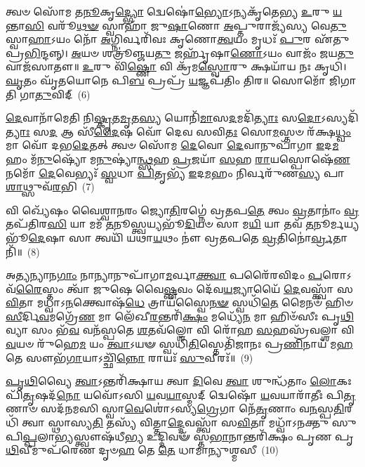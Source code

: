 {\anuvakamend[{𑌅𑌨𑍀᳴𑌕𑍇\-\ul{𑌨𑌾}\-𑌷𑍍𑌟𑍗 𑌚᳴}]}%

𑌤𑍍𑌵𑍞 𑌸𑍋᳴𑌮 𑌤\-\ul{𑌨𑍂}\-𑌕𑍃\-\ul{𑌦𑍍𑌭𑍍𑌯𑍋} 𑌦𑍍𑌵𑍇𑌷𑍋॑\-\ul{𑌭𑍍𑌯𑍋}\-\-𑌽𑌨𑍍𑌯𑌕𑍃᳴𑌤𑍇𑌭𑍍𑌯 \ul{𑌉}\-𑌰𑍁 \ul{𑌯}\-𑌨𑍍𑌤𑌾\-\ul{𑌸𑌿} 𑌵𑌰𑍂᳴\-\ul{𑌥}\-\-\ul{𑍟} 𑌸𑍍𑌵𑌾𑌹𑌾᳴ 𑌜𑍁\-\ul{𑌷𑌾}\-𑌣𑍋 \ul{𑌅}\-𑌪𑍍𑌤𑍁𑌰𑌾𑌜𑍍𑌯᳴𑌸𑍍𑌯 𑌵𑍇\-\ul{𑌤𑍁} 𑌸𑍍𑌵𑌾\-\ul{𑌹𑌾}\-\-𑌽𑌯𑌂 𑌨𑍋᳴ \ul{𑌅}\-𑌗𑍍𑌨𑌿𑌰𑍍𑌵𑌰𑌿᳴𑌵𑌃 𑌕𑍃𑌣𑍋\-\ul{𑌤𑍍𑌵}\-𑌯𑌂 𑌮𑍃𑌧𑌃᳴ \ul{𑌪𑍁}\-𑌰 𑌏᳴𑌤𑍁 𑌪𑍍𑌰\-\ul{𑌭𑌿}\-𑌨𑍍𑌦𑌨𑍍𑌨𑍍। \ul{𑌅}\-𑌯𑍞 𑌶𑌤𑍍𑌰𑍂॑𑌞𑍍𑌜𑌯\-\ul{𑌤𑍁} 𑌜𑌰𑍍\mbox{}𑌹𑍃᳴𑌷𑌾\-\ul{𑌣𑍋}\-\-𑌽𑌯𑌂 𑌵𑌾𑌜𑌂᳴ 𑌜𑌯\-\ul{𑌤𑍁} 𑌵𑌾𑌜᳴𑌸𑌾𑌤𑍗॥ \ul{𑌉}\-𑌰𑍁 𑌵𑌿᳴\-\ul{𑌷𑍍𑌣𑍋} 𑌵𑌿 𑌕𑍍𑌰᳴𑌮\-\ul{𑌸𑍍𑌵𑍋}\-𑌰𑍁 𑌕𑍍𑌷𑌯𑌾᳴𑌯 𑌨𑌃 𑌕𑍃𑌧𑌿। \ul{𑌘𑍃}\-𑌤𑌂 𑌘𑍃᳴𑌤𑌯𑍋𑌨𑍇 𑌪𑌿\-\ul{𑌬} 𑌪𑍍𑌰𑌪𑍍𑌰᳴ \ul{𑌯}\-𑌜𑍍𑌞𑌪᳴𑌤𑌿𑌂 𑌤𑌿𑌰॥ 𑌸𑍋𑌮𑍋᳴ 𑌜𑌿𑌗𑌾𑌤𑌿 𑌗𑌾\-\ul{𑌤𑍁}\-𑌵𑌿𑌦𑍍~(6)

\-\ul{𑌦𑍇}\-𑌵𑌾𑌨𑌾᳴𑌮𑍇𑌤𑌿 𑌨𑌿\-\ul{𑌷𑍍𑌕𑍃}\-𑌤\-\ul{𑌮𑍃}\-𑌤\-\ul{𑌸𑍍𑌯} 𑌯𑍋𑌨𑌿᳴\-\ul{𑌮𑌾}\-𑌸\-\ul{𑌦}\-𑌮𑌦𑌿᳴\-\ul{𑌤𑍍𑌯𑌾𑌃} 𑌸\-\ul{𑌦𑍋}\-\-𑌽𑌸𑍍𑌯𑌦𑌿᳴\-\ul{𑌤𑍍𑌯𑌾𑌃} 𑌸\-\ul{𑌦} 𑌆 𑌸𑍀᳴\-\ul{𑌦𑍈}\-𑌷 𑌵𑍋᳴ 𑌦𑍇𑌵 𑌸𑌵𑌿\-\ul{𑌤𑌃} 𑌸𑍋\-\ul{𑌮}\-𑌸𑍍𑌤𑍞 𑌰᳴𑌕𑍍𑌷\-\ul{𑌧𑍍𑌵𑌂} 𑌮𑌾 𑌵𑍋᳴ 𑌦𑌭\-\ul{𑌦𑍇}\-𑌤𑌤𑍍 𑌤𑍍𑌵𑍞 𑌸𑍋᳴𑌮 \ul{𑌦𑍇}\-𑌵𑍋 \ul{𑌦𑍇}\-𑌵𑌾𑌨𑍁𑌪𑌾᳴𑌗𑌾 \ul{𑌇}\-𑌦\-\ul{𑌮}\-𑌹𑌂 𑌮᳴\-\ul{𑌨𑍁}\-𑌷𑍍𑌯𑍋᳴ 𑌮\-\ul{𑌨𑍁}\-𑌷𑍍𑌯𑌾॑\-\ul{𑌨𑍍𑌥𑍍𑌸}\-𑌹 \ul{𑌪𑍍𑌰}\-𑌜𑌯𑌾᳴ \ul{𑌸}\-𑌹 \ul{𑌰𑌾}\-𑌯𑌸𑍍𑌪𑍋𑌷𑍇᳴\-\ul{𑌣} 𑌨𑌮𑍋᳴ \ul{𑌦𑍇}\-𑌵𑍇𑌭𑍍𑌯𑌃᳴ \ul{𑌸𑍍𑌵}\-𑌧𑌾 \ul{𑌪𑌿}\-𑌤𑍃𑌭𑍍𑌯᳴ \ul{𑌇}\-𑌦\-\ul{𑌮}\-𑌹𑌂 𑌨𑌿𑌰𑍍𑌵𑌰𑍁᳴𑌣\-\ul{𑌸𑍍𑌯} 𑌪𑌾\-\ul{𑌶𑌾}\-𑌥𑍍𑌸𑍁𑌵᳴\-\ul{𑌰}\-𑌭𑌿~(7)

𑌵𑌿 𑌖𑍍𑌯𑍇᳴𑌷𑌂 𑌵𑍈𑌶𑍍𑌵𑌾\-\ul{𑌨}\-𑌰𑌂 𑌜𑍍𑌯𑍋\-\ul{𑌤𑌿}\-𑌰𑌗𑍍𑌨𑍇॑ 𑌵𑍍𑌰𑌤𑌪\-\ul{𑌤𑍇} 𑌤𑍍𑌵𑌂 \ul{𑌵𑍍𑌰}\-𑌤𑌾𑌨𑌾𑌂॑ \ul{𑌵𑍍𑌰}\-𑌤𑌪᳴𑌤𑌿𑌰\-\ul{𑌸𑌿} 𑌯𑌾 𑌮𑌮᳴ \ul{𑌤}\-𑌨𑍂𑌸𑍍𑌤𑍍𑌵𑌯𑍍𑌯𑌭𑍂᳴\-\ul{𑌦𑌿}\-𑌯𑍞 𑌸𑌾 𑌮\-\ul{𑌯𑌿} 𑌯𑌾 𑌤𑌵᳴ \ul{𑌤}\-𑌨𑍂𑌰𑍍𑌮𑌯𑍍𑌯𑌭𑍂᳴\-\ul{𑌦𑍇}\-𑌷𑌾 𑌸𑌾 𑌤𑍍𑌵𑌯𑌿᳴ 𑌯𑌥𑌾\-\ul{𑌯}\-𑌥𑌂 𑌨𑍗॑ 𑌵𑍍𑌰𑌤𑌪𑌤𑍇 \ul{𑌵𑍍𑌰}\-𑌤𑌿𑌨𑍋॑\-\ul{𑌰𑍍𑌵𑍍𑌰}\-𑌤𑌾𑌨𑌿᳴॥~(8)

{\anuvakamend[{\-\ul{𑌗𑌾}\-\-\ul{𑌤𑍁}\-𑌵𑌿\-\ul{𑌦}\-𑌭𑍍𑌯𑍇𑌕᳴𑌤𑍍𑌰𑌿𑍞𑌶𑌚𑍍𑌚}]}%

𑌅\-\ul{𑌤𑍍𑌯}\-𑌨𑍍𑌯𑌾𑌨\-\ul{𑌗𑌾𑌂} 𑌨𑌾𑌨𑍍𑌯𑌾𑌨𑍁𑌪𑌾᳴𑌗𑌾\-\ul{𑌮}\-𑌰𑍍𑌵𑌾\-\ul{𑌕𑍍𑌤𑍍𑌵𑌾} 𑌪𑌰𑍈᳴𑌰𑌵𑌿𑌦𑌂 \ul{𑌪}\-𑌰𑍋\-𑌽𑌵᳴\-\ul{𑌰𑍈}\-𑌸𑍍𑌤𑌂 𑌤𑍍𑌵𑌾᳴ 𑌜𑍁𑌷𑍇 𑌵𑍈\-\ul{𑌷𑍍𑌣}\-𑌵𑌂 𑌦𑍇᳴𑌵\-\ul{𑌯}\-𑌜𑍍𑌯𑌾𑌯𑍈᳴ \ul{𑌦𑍇}\-𑌵𑌸𑍍𑌤𑍍𑌵𑌾᳴ 𑌸\-\ul{𑌵𑌿}\-𑌤𑌾 𑌮𑌧𑍍𑌵𑌾᳴\-𑌽\-\ul{𑌨}\-𑌕𑍍𑌤𑍍𑌵𑍋𑌷᳴\-\ul{𑌧𑍇} 𑌤𑍍𑌰𑌾𑌯᳴𑌸𑍍𑌵𑍈\-\ul{𑌨}\-\-\ul{𑍟} 𑌸𑍍𑌵𑌧𑌿᳴\-\ul{𑌤𑍇} 𑌮𑍈𑌨𑍞᳴ 𑌹𑌿𑍞\-\ul{𑌸𑍀}\-𑌰𑍍𑌦𑌿\-\ul{𑌵}\-𑌮𑌗𑍍𑌰𑍇᳴\-\ul{𑌣} 𑌮𑌾 𑌲𑍇᳴𑌖𑍀\-\ul{𑌰}\-𑌨𑍍𑌤𑌰𑌿᳴\-\ul{𑌕𑍍𑌷𑌂} 𑌮𑌧𑍍𑌯𑍇᳴\-\ul{𑌨} 𑌮𑌾 𑌹𑌿𑍞᳴𑌸𑍀𑌃 𑌪𑍃\-\ul{𑌥𑌿}\-𑌵𑍍𑌯𑌾 𑌸𑌂 𑌭᳴\-\ul{𑌵} 𑌵𑌨᳴𑌸𑍍𑌪𑌤𑍇 \ul{𑌶}\-𑌤𑌵᳴𑌲𑍍\mbox{}\-\ul{𑌶𑍋} 𑌵𑌿 𑌰𑍋᳴𑌹 \ul{𑌸}\-𑌹𑌸𑍍𑌰᳴𑌵𑌲𑍍\mbox{}\-\ul{𑌶𑌾} 𑌵𑌿 \ul{𑌵}\-𑌯𑍞 𑌰𑍁᳴𑌹𑍇\-\ul{𑌮} 𑌯𑌂 \ul{𑌤𑍍𑌵𑌾}\-\-𑌽𑌯𑍟 𑌸𑍍𑌵𑌧𑌿᳴\-\ul{𑌤𑌿}\-𑌸𑍍𑌤𑍇𑌤𑌿᳴𑌜𑌾𑌨𑌃 𑌪𑍍𑌰\-\ul{𑌣𑌿}\-𑌨𑌾𑌯᳴ 𑌮\-\ul{𑌹}\-𑌤𑍇 𑌸𑍗𑌭᳴\-\ul{𑌗𑌾}\-𑌯𑌾\-𑌽𑌚𑍍𑌛𑌿᳴\-\ul{𑌨𑍍𑌨𑍋} 𑌰𑌾𑌯𑌃᳴ \ul{𑌸𑍁}\-𑌵𑍀𑌰𑌃᳴॥~(9)

{\anuvakamend[{𑌯𑌂 𑌦𑌶᳴ 𑌚}]}%

\-\ul{𑌪𑍃}\-\-\ul{𑌥𑌿}\-𑌵𑍍𑌯𑍈 \ul{𑌤𑍍𑌵𑌾}\-\-𑌽𑌨𑍍𑌤𑌰𑌿᳴𑌕𑍍𑌷𑌾𑌯 𑌤𑍍𑌵𑌾 \ul{𑌦𑌿}\-𑌵𑍇 \ul{𑌤𑍍𑌵𑌾} 𑌶𑍁𑌨𑍍𑌧᳴𑌤𑌾𑌂 \ul{𑌲𑍋}\-𑌕𑌃 𑌪𑌿᳴\-\ul{𑌤𑍃}\-𑌷𑌦᳴\-\ul{𑌨𑍋} 𑌯𑌵𑍋᳴\-𑌽𑌸𑌿 \ul{𑌯}\-𑌵\-\ul{𑌯𑌾}\-𑌸𑍍𑌮𑌦𑍍 𑌦𑍍𑌵𑍇𑌷𑍋᳴ \ul{𑌯}\-𑌵𑌯𑌾𑌰𑌾᳴𑌤𑍀𑌃 𑌪𑌿\-\ul{𑌤𑍃}\-𑌣𑌾𑍞 𑌸𑌦᳴𑌨𑌮𑌸𑌿 𑌸𑍍𑌵𑌾\-\ul{𑌵𑍇}\-𑌶𑍋॑\-𑌽𑌸𑍍𑌯\-\ul{𑌗𑍍𑌰𑍇}\-𑌗𑌾 𑌨𑍇᳴\-\ul{𑌤𑍃}\-𑌣𑌾𑌂 𑌵\-\ul{𑌨}\-𑌸𑍍𑌪\-\ul{𑌤𑌿}\-𑌰𑌧𑌿᳴ 𑌤𑍍𑌵𑌾 𑌸𑍍𑌥𑌾𑌸𑍍𑌯\-\ul{𑌤𑌿} 𑌤𑌸𑍍𑌯᳴ 𑌵𑌿𑌤𑍍𑌤𑌾\-\ul{𑌦𑍍𑌦𑍇}\-𑌵𑌸𑍍𑌤𑍍𑌵𑌾᳴ 𑌸\-\ul{𑌵𑌿}\-𑌤𑌾 𑌮𑌧𑍍𑌵𑌾᳴\-𑌽𑌨𑌕𑍍𑌤𑍁 𑌸𑍁𑌪𑌿\-\ul{𑌪𑍍𑌪}\-𑌲𑌾\-\ul{𑌭𑍍𑌯}\-𑌸𑍍𑌤𑍍𑌵𑍗𑌷᳴𑌧𑍀\-\ul{𑌭𑍍𑌯} 𑌉𑌦𑍍𑌦𑌿𑌵𑍟᳴ 𑌸𑍍𑌤\-\ul{𑌭𑌾}\-𑌨𑌾𑌨𑍍𑌤𑌰𑌿᳴𑌕𑍍𑌷𑌂 𑌪𑍃𑌣 𑌪𑍃\-\ul{𑌥𑌿}\-𑌵𑍀𑌮𑍁𑌪᳴𑌰𑍇𑌣 𑌦𑍃𑍞\-\ul{𑌹} 𑌤𑍇 \ul{𑌤𑍇} 𑌧𑌾𑌮𑌾॑𑌨𑍍𑌯𑍁𑌶𑍍𑌮𑌸𑍀~(10)

